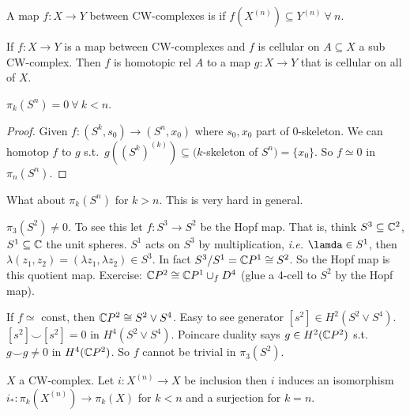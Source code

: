 \documentclass[12pt,class=article,crop=false]{standalone}
\begin{document}
A map $ f: X \to Y$ between CW-complexes is  if $ f(X^{(n)}) \subseteq Y^{(n)} \ \forall \ n$. 

\begin{thm}
If $ f: X \to Y$ is a map between CW-complexes and $ f$ is cellular on  $ A \subseteq X$ a sub CW-complex. Then $ f$ is homotopic rel  $ A$ to a map  $ g: X \to Y$ that is cellular on all of $ X$.
\end{thm}

\begin{prop}
$ \pi_k(S^{n}) = 0 \ \forall \ k <n$.
\end{prop}
\begin{proof}
Given $ f : (S^{k},s_0) \to (S^{n},x_0)$ where $ s_0,x_0$ part of $ 0$-skeleton. We can homotop  $ f$ to  $ g$  s.t.\ $ g((S^{k})^{(k)}) \subseteq (k$-skeleton of $ S^{n}) = \{x_0\} $. So $ f \simeq 0$ in $ \pi_n(S^{n})$.
\end{proof}

What about $ \pi_k(S^{n}) $ for $ k>n$. This is very hard in general.
 \begin{eg}
$ \pi_3(S^2) \neq 0$. To see this let $ f: S^3 \to S^2$ be the Hopf map. That is, think $ S^3 \subseteq \mathbb{C}^2$, $ S^{1} \subseteq \mathbb{C}$ the unit spheres. $ S^{1}$ acts on $ S^3$ by multiplication, \emph{i.e.} $ \lamda \in S^{1}$, then $ \lambda(z_1,z_2) = (\lambda z_1, \lambda z_2) \in S^3$. In fact $ S^3 /S^{1} = \mathbb{C} P^{1} \cong S^2$. So the Hopf map is this quotient map. Exercise: $ \mathbb{C} P^2  \cong \mathbb{C} P^{1} \cup _f D^{4}$ (glue a 4-cell to $ S^2$ by the Hopf map).

If $ f \simeq $ const, then $ \mathbb{C} P^2 \cong S^2 \vee S^{4}$. Easy to see generator $ [s^2] \in H^2(S^2 \vee S^{4})$. $ [s^2] \smile [s^2] = 0$ in $ H^{4}(S^2 \vee S^{4})$. Poincare duality says $ g \in H^2( \mathbb{C} P^2)$ s.t.\ $ g \smile g \neq 0$ in $ H^{4}( \mathbb{C} P^2)$. So $ f$ cannot be trivial in  $ \pi_3(S^2)$.
\end{eg}

\begin{lem}
$ X$ a CW-complex. Let  $ i : X^{(n)} \to X$ be inclusion then $ i$ induces an isomorphism  $ i_*: \pi_k(X^{(n)}) \to \pi_k(X)$ for $ k <n$ and a surjection for  $ k=n$.
\end{lem}
\end{document}
